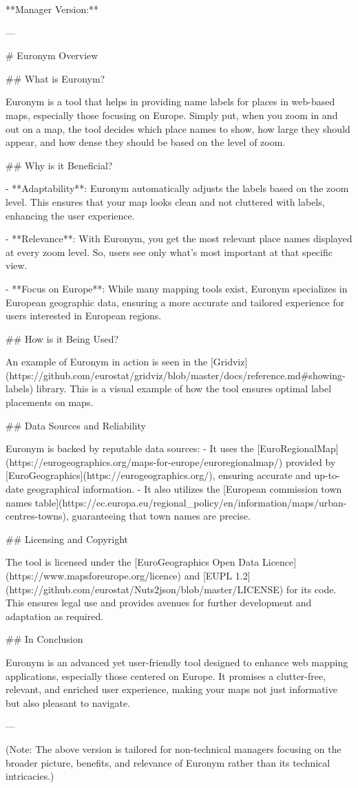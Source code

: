 **Manager Version:**

---

# Euronym Overview

## What is Euronym?

Euronym is a tool that helps in providing name labels for places in web-based maps, especially those focusing on Europe. Simply put, when you zoom in and out on a map, the tool decides which place names to show, how large they should appear, and how dense they should be based on the level of zoom.

## Why is it Beneficial?

- **Adaptability**: Euronym automatically adjusts the labels based on the zoom level. This ensures that your map looks clean and not cluttered with labels, enhancing the user experience.
  
- **Relevance**: With Euronym, you get the most relevant place names displayed at every zoom level. So, users see only what's most important at that specific view.

- **Focus on Europe**: While many mapping tools exist, Euronym specializes in European geographic data, ensuring a more accurate and tailored experience for users interested in European regions.

## How is it Being Used?

An example of Euronym in action is seen in the [Gridviz](https://github.com/eurostat/gridviz/blob/master/docs/reference.md#showing-labels) library. This is a visual example of how the tool ensures optimal label placements on maps.

## Data Sources and Reliability

Euronym is backed by reputable data sources:
- It uses the [EuroRegionalMap](https://eurogeographics.org/maps-for-europe/euroregionalmap/) provided by [EuroGeographics](https://eurogeographics.org/), ensuring accurate and up-to-date geographical information.
- It also utilizes the [European commission town names table](https://ec.europa.eu/regional_policy/en/information/maps/urban-centres-towns), guaranteeing that town names are precise.

## Licensing and Copyright

The tool is licensed under the [EuroGeographics Open Data Licence](https://www.mapsforeurope.org/licence) and [EUPL 1.2](https://github.com/eurostat/Nuts2json/blob/master/LICENSE) for its code. This ensures legal use and provides avenues for further development and adaptation as required.

## In Conclusion

Euronym is an advanced yet user-friendly tool designed to enhance web mapping applications, especially those centered on Europe. It promises a clutter-free, relevant, and enriched user experience, making your maps not just informative but also pleasant to navigate.

---

(Note: The above version is tailored for non-technical managers focusing on the broader picture, benefits, and relevance of Euronym rather than its technical intricacies.)